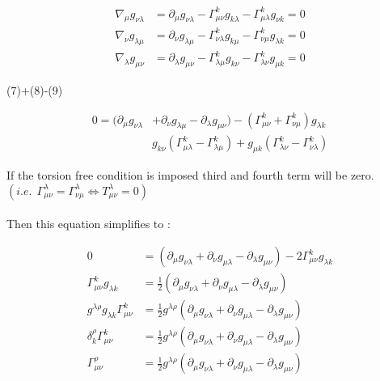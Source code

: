 \documentclass[12pt, letterpaper]{article}
\newcommand*{\1}{\hspace{1pt}}
\begin{document}
            \begin{align}
            \nabla _{\mu} g_{\nu \lambda} & = \partial_{\mu}g_{\nu \lambda} - \Gamma ^{k}_{\mu \nu}g_{k \lambda} - \Gamma ^{k}_{\mu \lambda}g_{\nu k} = 0 \\ 
            \nabla _{\nu} g_{\lambda \mu} & = \partial_{\nu}g_{\lambda \mu} - \Gamma ^{k}_{\nu \lambda}g_{k \mu} - \Gamma ^{k}_{\nu \mu}g_{\lambda k} = 0 \\ 
            \nabla _{\lambda} g_{\mu \nu} & = \partial_{\lambda}g_{\mu \nu} - \Gamma ^{k}_{\lambda \mu}g_{k \nu} - \Gamma ^{k}_{\lambda \nu}g_{\mu k} = 0
            \end{align}

        (7)+(8)-(9)

        \begin{equation}
            \begin{split}
                0 = (\partial _{\mu}g_{\nu \lambda}  &+ \partial_{\nu}g_{\lambda \mu} - \partial_{\lambda}g_{\mu \nu}) - (\Gamma ^{k} _{\mu \nu} + \Gamma ^{k} _{\nu \mu}) g_{\lambda k} \\
                 & g_{k \nu}(\Gamma ^{k} _{\mu \lambda} - \Gamma ^{k} _{\lambda \mu}) + g_{\mu k}(\Gamma ^{k} _{\lambda \nu} - \Gamma ^{k} _{\nu \lambda}) 
            \end{split}
        \end{equation}

        If the torsion free condition is imposed third and fourth term will be zero.$\left(i.e. \ \  \Gamma ^{\lambda}_{\mu \nu}=\Gamma^{\lambda} _{\nu \mu}\Leftrightarrow T^{\lambda} _{\mu \nu} = 0\right)$ \\ 
        \\
        Then this equation simplifies to : 

        \begin{equation}
            \begin{split}
                0 & = \left(\partial_{\mu} g_{\nu \lambda} + \partial_{\nu}g_{\mu \lambda} - \partial_{\lambda}g_{\mu \nu}\right) - 2 \Gamma^{k}_{\mu \nu}g_{\lambda k} \\ 
                \Gamma^{k}_{\mu \nu}g_{\lambda k} & = \frac{1}{2}\left(\partial_{\mu} g_{\nu \lambda} + \partial_{\nu}g_{\mu \lambda} - \partial_{\lambda}g_{\mu \nu}\right) \\
                g^{\lambda \rho} g_{\lambda k}\Gamma^{k}_{\mu \nu}  & = \frac{1}{2}g^{\lambda \rho}\left(\partial_{\mu} g_{\nu \lambda} + \partial_{\nu}g_{\mu \lambda} - \partial_{\lambda}g_{\mu \nu}\right) \\
                \delta ^{\rho} _{k} \Gamma ^{k} _{\mu \nu} & = \frac{1}{2}g^{\lambda \rho}\left(\partial_{\mu} g_{\nu \lambda} + \partial_{\nu}g_{\mu \lambda} - \partial_{\lambda}g_{\mu \nu}\right) \\
                \Gamma ^{\rho} _{\mu \nu} & = \frac{1}{2} g ^{\lambda \rho}\left(\partial_{\mu} g_{\nu \lambda} + \partial_{\nu}g_{\mu \lambda} - \partial_{\lambda}g_{\mu \nu}\right) 
            \end{split}
        \end{equation}
            
\end{document}
